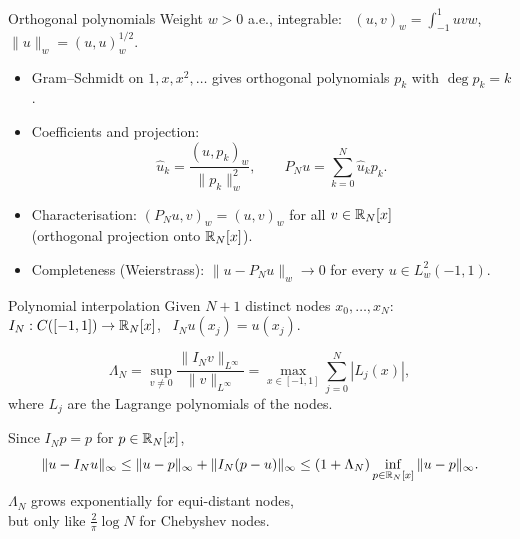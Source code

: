 \begin{frame}{Orthogonal polynomials}
    Weight $w > 0$ a.e., integrable: \ $(u,v)_w = \int_{-1}^1 u v w$, \ $\|u\|_w = (u,u)_w^{1/2}$.
    \begin{itemize}
        \item Gram--Schmidt on $1, x, x^2, \dots$ gives orthogonal polynomials $p_k$ with $\deg p_k = k$.
        \item Coefficients and projection:
              \[
                  \hat u_k = \frac{(u, p_k)_w}{\|p_k\|_w^2}, \qquad P_N u = \sum_{k=0}^N \hat u_k p_k .
              \]
        \item Characterisation: $(P_N u, v)_w = (u,v)_w$ for all $v \in {\mathbb R}_N[x]$\\ (orthogonal projection onto ${\mathbb R}_N[x]$).
        \item Completeness (Weierstrass): $\|u - P_N u\|_w \to 0$ for every $u \in L^2_w(-1,1)$.
    \end{itemize}
\end{frame}

\begin{frame}{Polynomial interpolation}
    Given $N+1$ distinct nodes $x_0, \dots, x_N$: \ $I_N : C([-1,1]) \to {\mathbb R}_N[x]$, \ $I_N u(x_j) = u(x_j)$.
    \begin{definition}
        \[
            \Lambda_N = \sup_{v \ne 0} \frac{\|I_N v\|_{L^\infty}}{\|v\|_{L^\infty}} = \max_{x \in [-1,1]} \sum_{j=0}^N |L_j(x)|,
        \]
        where $L_j$ are the Lagrange polynomials of the nodes.
    \end{definition}
    \begin{remark}
        Since $I_N p = p$ for $p \in {\mathbb R}_N[x]$,
        \[
            \|u - I_N u\|_\infty \le \|u - p\|_\infty + \|I_N(p - u)\|_\infty \le (1 + \Lambda_N) \inf_{p \in {\mathbb R}_N[x]} \|u - p\|_\infty .
        \]
        $\Lambda_N$ grows exponentially for equi-distant nodes,\\ but only like $\frac{2}{\pi}\log N$ for Chebyshev nodes.
    \end{remark}
\end{frame}

